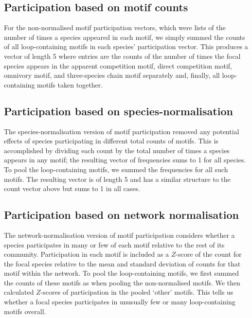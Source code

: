 \documentclass[12pt]{article}
\begin{document}
\begin{spacing}{2.0}
	\subsection*{Participation based on motif counts}

		For the non-normalised motif participation vectors, which were lists of the number of times a species appeared in each motif, we simply summed the counts of all loop-containing motifs in each species' participation vector.
		This produces a vector of length 5 where entries are the counts of the number of times the focal species appears in the apparent competition motif, direct competition motif, omnivory motif, and three-species chain motif separately and, finally, all loop-containing motifs taken together.


	\subsection*{Participation based on species-normalisation}

		The species-normalisation version of motif participation removed any potential effects of species participating in different total counts of motifs.
		This is accomplished by dividing each count by the total number of times a species appears in any motif; the resulting vector of frequencies sums to 1 for all species.
		To pool the loop-containing motifs, we summed the frequencies for all such motifs.
		The resulting vector is of length 5 and has a similar structure to the count vector above but sums to 1 in all cases.


	\subsection*{Participation based on network normalisation}

		The network-normalisation version of motif participation considers whether a species participates in many or few of each motif relative to the rest of its community.
		Participation in each motif is included as a $Z$-score of the count for the focal species relative to the mean and standard deviation of counts for that motif within the network.
		To pool the loop-containing motifs, we first summed the counts of these motifs as when pooling the non-normalised motifs.
		We then calculated $Z$-scores of participation in the pooled `other' motifs.
		This tells us whether a focal species participates in unusually few or many loop-containing motifs overall.



\end{spacing}
\end{document}
